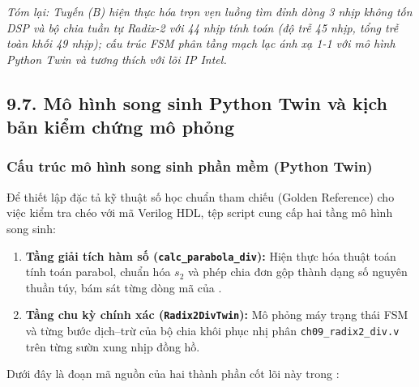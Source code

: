 \textit{Tóm lại: Tuyến (B) hiện thực hóa trọn vẹn luồng tìm đỉnh dòng 3 nhịp không tốn DSP và bộ chia tuần tự Radix-2 với 44 nhịp tính toán (độ trễ 45 nhịp, tổng trễ toàn khối 49 nhịp); cấu trúc FSM phân tầng mạch lạc ánh xạ 1-1 với mô hình Python Twin và tương thích với lõi IP Intel.}

\subsection*{9.7. Mô hình song sinh Python Twin và kịch bản kiểm chứng mô phỏng}

\subsubsection*{Cấu trúc mô hình song sinh phần mềm (Python Twin)}
Để thiết lập đặc tả kỹ thuật số học chuẩn tham chiếu (Golden Reference) cho việc kiểm tra chéo với mã Verilog HDL, tệp script  cung cấp hai tầng mô hình song sinh:
\begin{enumerate}[leftmargin=1.5em, itemsep=2pt]
    \item \textbf{Tầng giải tích hàm số (\texttt{calc\_parabola\_div}):} Hiện thực hóa thuật toán tính toán parabol, chuẩn hóa $s_2$ và phép chia đơn gộp thành dạng số nguyên thuần túy, bám sát từng dòng mã của .
    \item \textbf{Tầng chu kỳ chính xác (\texttt{Radix2DivTwin}):} Mô phỏng máy trạng thái FSM và từng bước dịch--trừ của bộ chia khôi phục nhị phân \texttt{ch09\_radix2\_div.v} trên từng sườn xung nhịp đồng hồ.
\end{enumerate}

Dưới đây là đoạn mã nguồn của hai thành phần cốt lõi này trong :





